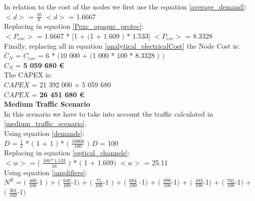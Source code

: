 In relation to the cost of the nodes we first use the equation \ref{average_demand}:\\

$<d>$ = $\frac{10}{6}$ \qquad \qquad $<d>$ = 1.6667\\

Replacing in equation \ref{Pexc_opaque_protec}:\\

$<P_{exc}>$ = 1.6667 * $[$1 + $($1 + $1.609$ $)$ * 1.533$]$ \qquad \quad $<P_{exc}>$ = 8.3328 \\

Finally, replacing all in equation \ref{analytical_electricalCost} the Node Cost is:\\

$C_N$ = $C_{exc}$ = 6 * $($10 000 + $($1 000 * 100 * 8.3328 $)$ $)$\\

$C_N$ = \textbf{5 059 680 \euro}\\

The CAPEX is:\\
$CAPEX$ = 21 392 000 + 5 059 680\\

$CAPEX$ = \textbf{26 451 680 \euro}\\

\textbf{Medium Traffic Scenario}\\
In this scenario we have to take into account the traffic calculated in \ref{medium_traffic_scenario}.\\

Using equation \ref{demands}:\\

$D$ = $\frac{1}{2}$ * $($ 1 + 1 $)$ * $($ $\frac{10000}{100}$ $)$ \qquad \qquad $D$ = 100\\

Replacing in equation \ref{optical_channels}:\\

$<w>$ = $($ $\frac{100 * 1.533}{16}$ $)$ * $($ 1 + 1.609$)$ \qquad \qquad $<w>$ = 25.11\\

Using equation \ref{amplifiers}:\\

$N^R$ = $($ $\frac{460}{100}$-1 $)$ + $($ $\frac{640}{100}$-1$)$ + $($ $\frac{75}{100}$-1 $)$ + $($ $\frac{684}{100}$ -1$)$ + $($ $\frac{890}{100}$-1$)$ + $($ $\frac{103}{100}$-1$)$ + $($ $\frac{761}{100}$-1$)$ + $($ $\frac{361}{100}$-1$)$\\

